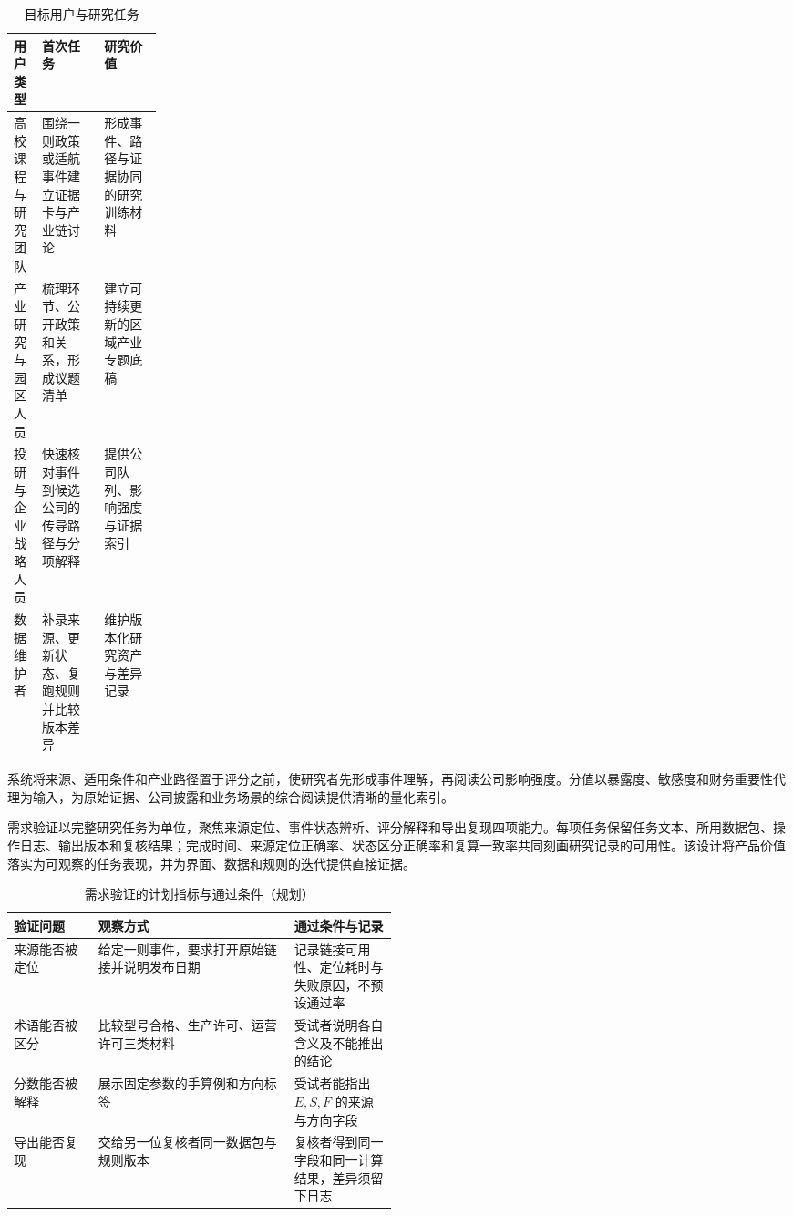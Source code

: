 \begin{table}[!htbp]
\centering
\caption{目标用户与研究任务}
\label{tab:wty-user-tasks}
\small
\begin{tabularx}{\linewidth}{p{0.19\linewidth}X X}
\toprule
用户类型 & 首次任务 & 研究价值 \\
\midrule
高校课程与研究团队 & 围绕一则政策或适航事件建立证据卡与产业链讨论 & 形成事件、路径与证据协同的研究训练材料 \\
产业研究与园区人员 & 梳理环节、公开政策和关系，形成议题清单 & 建立可持续更新的区域产业专题底稿 \\
投研与企业战略人员 & 快速核对事件到候选公司的传导路径与分项解释 & 提供公司队列、影响强度与证据索引 \\
数据维护者 & 补录来源、更新状态、复跑规则并比较版本差异 & 维护版本化研究资产与差异记录 \\
\bottomrule
\end{tabularx}
\end{table}

系统将来源、适用条件和产业路径置于评分之前，使研究者先形成事件理解，再阅读公司影响强度。分值以暴露度、敏感度和财务重要性代理为输入，为原始证据、公司披露和业务场景的综合阅读提供清晰的量化索引。



需求验证以完整研究任务为单位，聚焦来源定位、事件状态辨析、评分解释和导出复现四项能力。每项任务保留任务文本、所用数据包、操作日志、输出版本和复核结果；完成时间、来源定位正确率、状态区分正确率和复算一致率共同刻画研究记录的可用性。该设计将产品价值落实为可观察的任务表现，并为界面、数据和规则的迭代提供直接证据。

\begin{table}[!htbp]
\centering
\caption{需求验证的计划指标与通过条件（规划）}
\label{tab:wty-validation-plan}
\small
\begin{tabularx}{\linewidth}{p{0.22\linewidth}X p{0.27\linewidth}}
\toprule
验证问题 & 观察方式 & 通过条件与记录 \\
\midrule
来源能否被定位 & 给定一则事件，要求打开原始链接并说明发布日期 & 记录链接可用性、定位耗时与失败原因，不预设通过率 \\
术语能否被区分 & 比较型号合格、生产许可、运营许可三类材料 & 受试者说明各自含义及不能推出的结论 \\
分数能否被解释 & 展示固定参数的手算例和方向标签 & 受试者能指出 $E,S,F$ 的来源与方向字段 \\
导出能否复现 & 交给另一位复核者同一数据包与规则版本 & 复核者得到同一字段和同一计算结果，差异须留下日志 \\
\bottomrule
\end{tabularx}
\end{table}

